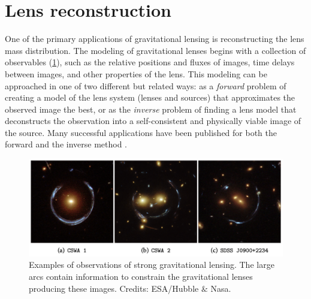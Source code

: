 \section{Lens reconstruction}
\label{sec:lens_reconstruction}

One of the primary applications of gravitational lensing is reconstructing the lens mass distribution. The modeling of gravitational lenses begins with a collection of observables (\cref{fig:observables}), such as the relative positions and fluxes of images, time delays between images, and other properties of the lens. This modeling can be approached in one of two different but related ways: as a \emph{forward} problem of creating a model of the lens system (lenses and sources) that approximates the observed image the best, or as the \emph{inverse} problem of finding a lens model that deconstructs the observation into a self-consistent and physically viable image of the source. Many successful applications have been published for both the forward \citep{bandara_witnessing_2013,bolton_sloan_2008,newton_sloan_2011,peng_probing_2006} and the inverse method \citep{dye_decomposition_2005,kochanek_lensclean_1992,nightingale_adaptive_2015,suyu_bayesian_2006,vegetti_bayesian_2009,wallington_lensmem_1996,warren_semilinear_2003}.

\begin{figure}
    \centering
    \includegraphics[width=\linewidth, keepaspectratio]{img//chapter4/observables.png}
    \caption[Strong gravitational lensing observations]{Examples of observations of strong gravitational lensing. The large arcs contain information to constrain the gravitational lenses producing these images. \small{Credits: ESA/Hubble $\&$ Nasa}.}
    \label{fig:observables}
\end{figure}

